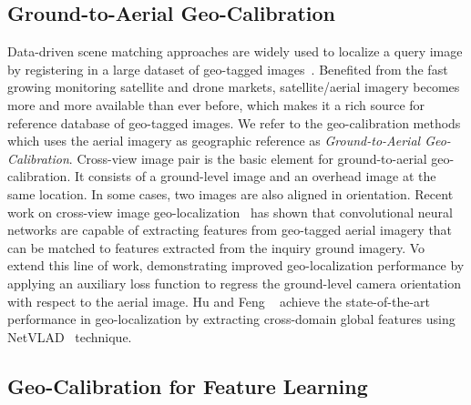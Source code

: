 \subsection{Ground-to-Aerial Geo-Calibration}
Data-driven scene matching approaches are widely used to localize a
query image by registering in a large dataset of geo-tagged
images~\cite{im2gps, li2010location,zamir2010accurate}.
Benefited from the fast growing monitoring satellite and drone markets,
satellite/aerial imagery becomes more and more available than ever
before, which makes it a rich source for
reference database of geo-tagged images. We refer to the
geo-calibration methods which uses the aerial imagery as geographic
reference as {\em Ground-to-Aerial Geo-Calibration}.
%
Cross-view image pair is the basic element for ground-to-aerial
geo-calibration. It consists of a ground-level image and an overhead
image at the same location. In some cases, two images are also aligned
in orientation. 
%
Recent work on cross-view image
geo-localization~\cite{lin2013cross,lin2015learning,workman2015geocnn,workman2015wide}
has shown that convolutional neural networks are capable of extracting
features from geo-tagged aerial imagery that can be matched to features extracted
from the inquiry ground imagery.  Vo \etal~\cite{vo2016localizing} extend this
line of work, demonstrating improved geo-localization performance by
applying an auxiliary loss function to regress the ground-level camera
orientation with respect to the aerial image. Hu and Feng
\etal~\cite{mh2018cvm} achieve the state-of-the-art performance in
geo-localization by extracting cross-domain global features using
NetVLAD~\cite{arandjelovic2016netvlad} technique.


\subsection{Geo-Calibration for Feature Learning}

